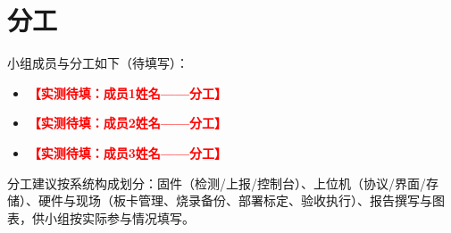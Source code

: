 \chapter{分工}

小组成员与分工如下（待填写）：

\begin{itemize}
  \item \textcolor{red}{\textbf{【实测待填：成员1姓名——分工】}}
  \item \textcolor{red}{\textbf{【实测待填：成员2姓名——分工】}}
  \item \textcolor{red}{\textbf{【实测待填：成员3姓名——分工】}}
\end{itemize}

分工建议按系统构成划分：固件（检测/上报/控制台）、上位机（协议/界面/存储）、硬件与现场（板卡管理、烧录备份、部署标定、验收执行）、报告撰写与图表，供小组按实际参与情况填写。
